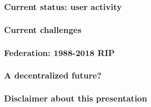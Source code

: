 \documentclass[aspectratio=169]{beamer}
\begin{document}
\begin{frame}
\frametitle{Current status: user activity}
\end{frame}

\begin{frame}
\frametitle{Current challenges}
\end{frame}


\begin{frame}
\frametitle{Federation: 1988-2018 RIP}
\end{frame}

\begin{frame}
\frametitle{A decentralized future?}
\end{frame}

\begin{frame}
\frametitle{Disclaimer about this presentation}
\end{frame}

\subtitle{Thank you}
\frame[plain]{\titlepage}
\end{document}
